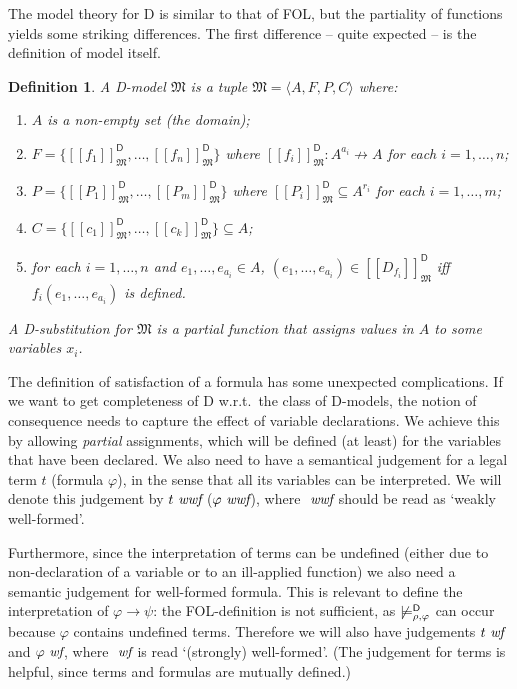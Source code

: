 \documentclass{article}
\newtheorem{definition}{Definition}[section]
\newcommand{\D}{\textsf D}
\newcommand{\FOL}{\textsf{FOL}}
\newcommand{\wf}{\ \mbox{\em wf}}
\newcommand{\wwf}{\ \mbox{\em wwf}}
\newcommand{\intm}[3]{\ensuremath{[\![{#3}]\!]^{\mathsf{#1}}_{\mathfrak{#2}}}}
\newcommand{\mymodelss}[3]{\ensuremath{\models_{\mathfrak{#2},{#3}}^{\mathsf{#1}}}}
\begin{document}
The model theory for {\D} is similar to that of {\FOL}, but the partiality
of functions yields some striking differences.
The first difference -- quite expected -- is the definition of model itself.

\begin{definition}\label{defn:Dmodel} A {\D}-model $\mathfrak M$
is a tuple $\mathfrak M=\langle A,F,P,C\rangle$ where:
\begin{enumerate}[--]
\item $A$ is a non-empty set (the domain);
\item $F=\{\intm{D}M{f_1},\ldots,\intm{D}M{f_n}\}$ where
$\intm{D}M{f_i}:A^{a_i}\not\to A$ for each $i=1,\ldots,n$;
\item $P=\{\intm{D}M{P_1},\ldots,\intm{D}M{P_m}\}$ where
$\intm{D}M{P_i}\subseteq A^{r_i}$ for each $i=1,\ldots,m$;
\item $C=\{\intm{D}M{c_1},\ldots,\intm{D}M{c_k}\}\subseteq A$;
\item for each $i=1,\ldots,n$ and $e_1,\ldots,e_{a_i}\in A$,
$(e_1,\ldots,e_{a_i})\in\intm{D}M{D_{f_i}}$ iff
$f_i(e_1,\ldots,e_{a_i})$ is defined.
\end{enumerate}
A {\D}-substitution for $\mathfrak M$ is a partial function that assigns
values in $A$ to some variables $x_i$.
\end{definition}

The definition of satisfaction of a formula has some unexpected
complications.  If we want to get completeness of {\D} w.r.t.\ the
class of {\D}-models, the notion of consequence needs to capture the
effect of variable declarations.  We achieve this by allowing
\emph{partial} assignments, which will be defined (at least) for the
variables that have been declared.  We also need to have a semantical
judgement for a legal term $t$ (formula $\varphi$), in the sense that all
its variables can be interpreted.  We will denote this judgement by
$t\wwf$ ($\varphi\wwf$), where $\wwf$ should be read as
`weakly well-formed'.

Furthermore, since the interpretation of terms can be undefined (either due
to non-declaration of a variable or to an ill-applied function) we also
need a semantic judgement for well-formed formula.  This is relevant to
define the interpretation of $\varphi\to\psi$: the {\FOL}-definition is
not sufficient, as $\not\mymodelss{D}\rho\varphi$ can occur because
$\varphi$ contains undefined terms.  Therefore we will also have
judgements $t\wf$ and $\varphi\wf$, where $\wf$ is read `(strongly)
well-formed'.  (The judgement for terms is helpful, since terms and
formulas are mutually defined.)
\end{document}
